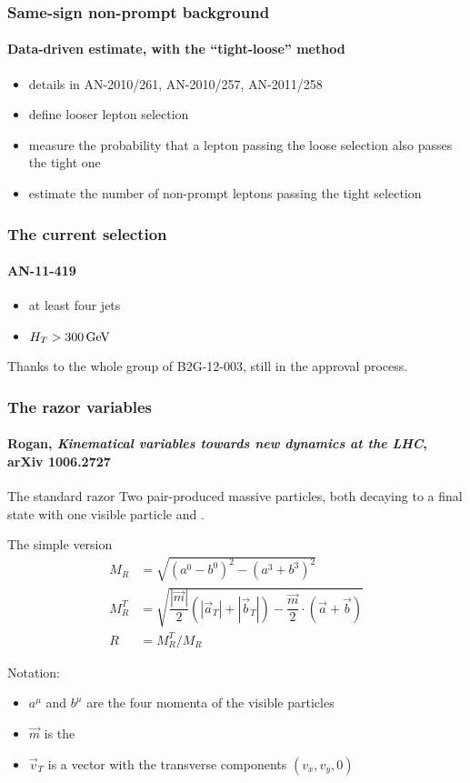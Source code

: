 \documentclass[ukenglish]{beamer}
\begin{document}
\begin{frame}
    \frametitle{Same-sign non-prompt background}
    \framesubtitle{Data-driven estimate, with the ``tight-loose'' method}
    \begin{itemize}
        \item details in AN-2010/261, AN-2010/257, AN-2011/258
        \item define looser lepton selection
        \item measure the probability that a lepton passing the loose
            selection also passes the tight one
        \item estimate the number of non-prompt leptons passing the tight
            selection
    \end{itemize}
\end{frame}

\begin{frame}
    \frametitle{The current selection}
    \framesubtitle{AN-11-419}
    \begin{itemize}
        \item at least four jets
        \item $H_T > \unit[300]{GeV}$
    \end{itemize}
    Thanks to the whole group of B2G-12-003, still in the approval process.
\end{frame}

\begin{frame}
    \frametitle{The razor variables}
    \framesubtitle{Rogan, \emph{Kinematical variables towards new dynamics
    at the LHC}, arXiv 1006.2727}
    \begin{block}{The standard razor}
        Two pair-produced massive particles, both decaying to a final state with
        one visible particle and \met.
    \end{block}
    \begin{block}
        {The simple version}
        \begin{align*}
            M_R &= \sqrt{(a^0 - b^0)^2 - (a^3 + b^3)^2} \\
            M_R^T &= \sqrt{\dfrac{|\vec{m}|}{2} (|\vec{a}_T| + |\vec{b}_T|) 
            -\dfrac{\vec{m}}{2} \cdot (\vec{a} + \vec{b})}\\
            R &= M_R^T / M_R
        \end{align*}
    \end{block}
    Notation:
    \begin{itemize}
        \item $a^\mu$ and $b^\mu$ are the four momenta of the visible
            particles
        \item $\vec{m}$ is the \met
        \item $\vec{v}_T$ is a vector with the transverse components
            $(v_x, v_y, 0)$
    \end{itemize}
\end{frame}
\end{document}
